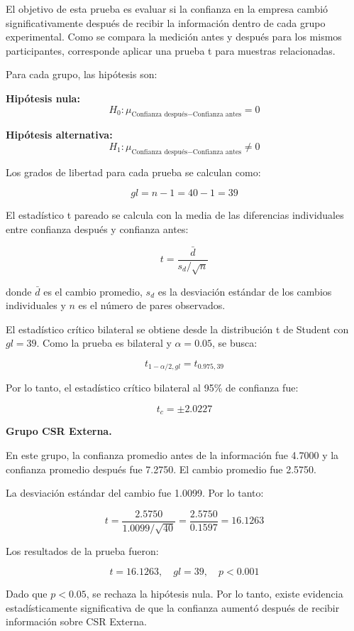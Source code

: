 \documentclass[12pt,letterpaper]{article}
\begin{document}
El objetivo de esta prueba es evaluar si la confianza en la empresa cambió significativamente después de recibir la información dentro de cada grupo experimental. Como se compara la medición antes y después para los mismos participantes, corresponde aplicar una prueba t para muestras relacionadas.

Para cada grupo, las hipótesis son:

\textbf{Hipótesis nula:}
\[
H_0: \mu_{\text{Confianza después} - \text{Confianza antes}} = 0
\]

\textbf{Hipótesis alternativa:}
\[
H_1: \mu_{\text{Confianza después} - \text{Confianza antes}} \neq 0
\]

Los grados de libertad para cada prueba se calculan como:

\[
gl = n - 1 = 40 - 1 = 39
\]

El estadístico t pareado se calcula con la media de las diferencias individuales entre confianza después y confianza antes:

\[
t =
\frac{\bar{d}}
{s_d/\sqrt{n}}
\]

donde \(\bar{d}\) es el cambio promedio, \(s_d\) es la desviación estándar de los cambios individuales y \(n\) es el número de pares observados.

El estadístico crítico bilateral se obtiene desde la distribución t de Student con \(gl = 39\). Como la prueba es bilateral y \(\alpha = 0.05\), se busca:

\[
t_{1-\alpha/2,gl} = t_{0.975,39}
\]

Por lo tanto, el estadístico crítico bilateral al 95\% de confianza fue:

\[
t_c = \pm 2.0227
\]

\textbf{Grupo CSR Externa.}

En este grupo, la confianza promedio antes de la información fue 4.7000 y la confianza promedio después fue 7.2750. El cambio promedio fue 2.5750.

La desviación estándar del cambio fue 1.0099. Por lo tanto:

\[
t =
\frac{2.5750}
{1.0099/\sqrt{40}}
=
\frac{2.5750}{0.1597}
= 16.1263
\]

Los resultados de la prueba fueron:

\[
t = 16.1263,\quad gl = 39,\quad p < 0.001
\]

Dado que \(p < 0.05\), se rechaza la hipótesis nula. Por lo tanto, existe evidencia estadísticamente significativa de que la confianza aumentó después de recibir información sobre CSR Externa.
\end{document}
